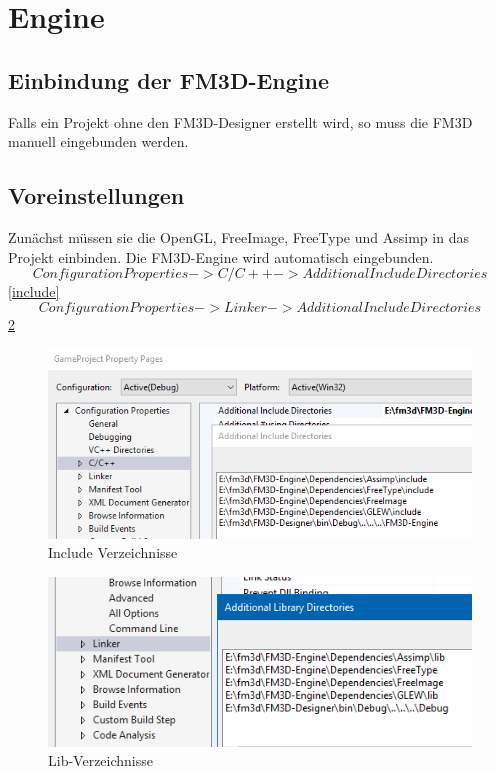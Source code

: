 \section{Engine}
\label{verwendung_engine}

\subsection{Einbindung der FM3D-Engine}
Falls ein Projekt ohne den FM3D-Designer erstellt wird, so muss die FM3D manuell eingebunden werden. 

\subsection{Voreinstellungen}
Zunächst müssen sie die OpenGL, FreeImage, FreeType und Assimp in das Projekt einbinden. Die FM3D-Engine wird automatisch eingebunden.
$$Configuration Properties->C/C++->Additional Include Directories$$\cref{include}
$$Configuration Properties->Linker->Additional Include Directories$$
\cref{liblib}

\begin{figure}
	\begin{center}
		\includegraphics[width=\textwidth]{04verwendung/Engine/include.png}
		\caption{Include Verzeichnisse}\label{includeinc}
	\end{center}
\end{figure}

\begin{figure}
	\begin{center}
		\includegraphics[width=\textwidth]{04verwendung/Engine/lib.png}
		\caption{Lib-Verzeichnisse}\label{liblib}
	\end{center}
\end{figure}

